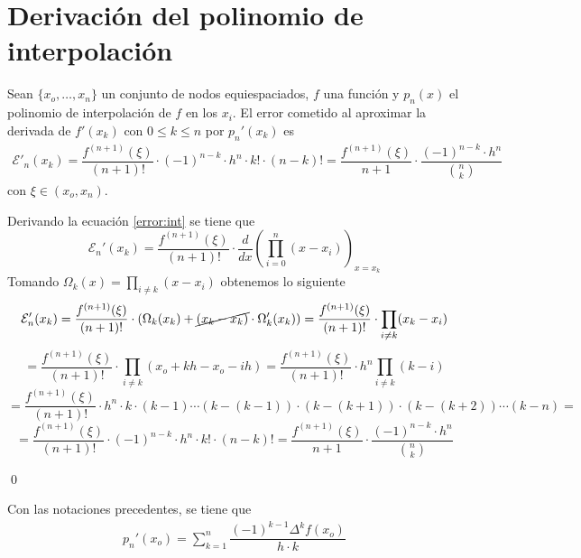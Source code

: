             \section{Derivaci{\'o}n del polinomio de interpolaci{\'o}n}
            \begin{prop}
            Sean $\{x_o,\ldots,x_n\}$ un conjunto de nodos equiespaciados, $f$ una función y $p_n(x)$ el polinomio de interpolación de $f$ en los $x_i$. El error cometido al aproximar la derivada de $f'(x_k)$ con  $0\leq k\leq n$ por $p_n'(x_k)$ es
            \begin{align}
            \mathcal{E}'_n(x_k)=\dfrac{f^{(n+1)}(\xi)}{(n+1)!}\cdot (-1)^{n-k}\cdot h^n\cdot k!\cdot (n-k)!= \dfrac{f^{(n+1)}(\xi)}{n+1} \cdot \dfrac{(-1)^{n-k}\cdot h^n}{\binom{n}{k}}
            \label{error:derivada}
            \end{align}
            con $\xi\in (x_o,x_n)$.
           \end{prop}
           \begin{dem}
            Derivando la ecuación \ref{error:int} se tiene que
            $$\mathcal{E}_n'(x_k)=\dfrac{f^{(n+1)}(\xi)}{(n+1)!}\cdot \dfrac{d}{dx}\left(\prod_{i=0}^n(x-x_i)\right)_{x=x_k}$$
            Tomando $\Omega_k(x)=\prod_{i\neq k}(x-x_i)$ obtenemos lo siguiente
            $$\mathcal{E}_n'(x_k)=\dfrac{f^{(n+1)}(\xi)}{(n+1)!}\cdot(\Omega_k(x_k)+\cancel{(x_k-x_k)}\cdot \Omega_k'(x_k))=\dfrac{f^{(n+1)}(\xi)}{(n+1)!}\cdot \prod_{i\neq k}(x_k-x_i)$$
            $$=\dfrac{f^{(n+1)}(\xi)}{(n+1)!}\cdot \prod_{i\neq k}(x_o+kh-x_o-ih)=\dfrac{f^{(n+1)}(\xi)}{(n+1)!}\cdot h^n \prod_{i\neq k}(k-i)$$
            $$=\dfrac{f^{(n+1)}(\xi)}{(n+1)!}\cdot h^n\cdot  k\cdot (k-1)\cdots (k-(k-1))\cdot (k-(k+1))\cdot (k-(k+2))\cdots(k-n)=$$
            $$=\dfrac{f^{(n+1)}(\xi)}{(n+1)!}\cdot (-1)^{n-k}\cdot h^n\cdot k!\cdot (n-k)! = \dfrac{f^{(n+1)}(\xi)}{n+1} \cdot \dfrac{(-1)^{n-k}\cdot h^n}{\binom{n}{k}}$$
            
           \qed\end{dem}
             \begin{prop}
            Con las notaciones precedentes, se tiene que
            \begin{align}
           p_n'(x_o)=\sum_{k=1}^n\dfrac{(-1)^{k-1}\Delta^k f(x_o)}{h\cdot k}
           \label{derivada:prog}
            \end{align}
            \end{prop}

